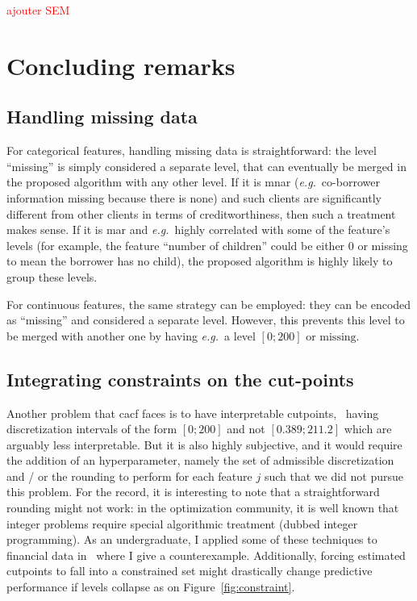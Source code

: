 \textcolor{red}{ajouter SEM}

\section{Concluding remarks}

\subsection{Handling missing data}

For categorical features, handling missing data is straightforward: the level ``missing'' is simply considered a separate level, that can eventually be merged in the proposed algorithm with any other level. If it is \gls{mnar} (\textit{e.g.}\ co-borrower information missing because there is none) and such clients are significantly different from other clients in terms of creditworthiness, then such a treatment makes sense. If it is \gls{mar} and \textit{e.g.}\ highly correlated with some of the feature's levels (for example, the feature ``number of children'' could be either $0$ or missing to mean the borrower has no child), the proposed algorithm is highly likely to group these levels.

For continuous features, the same strategy can be employed: they can be encoded as ``missing'' and considered a separate level. However, this prevents this level to be merged with another one by having \textit{e.g.}\ a level $[0;200] \text{ or missing}$.

\subsection{Integrating constraints on the cut-points}

Another problem that \gls{cacf} faces is to have interpretable cutpoints, \ having discretization intervals of the form $[0;200]$ and not $[0.389 ; 211.2]$ which are arguably less interpretable. But it is also highly subjective, and it would require the addition of an hyperparameter, namely the set of admissible discretization and / or the rounding to perform for each feature $j$ such that we did not pursue this problem. For the record, it is interesting to note that a straightforward rounding might not work: in the optimization community, it is well known that integer problems require special algorithmic treatment (dubbed integer programming). As an undergraduate, I applied some of these techniques to financial data in~\cite{} where I give a counterexample. Additionally, forcing estimated cutpoints to fall into a constrained set might drastically change predictive performance if levels collapse as on Figure~\ref{fig:constraint}.

